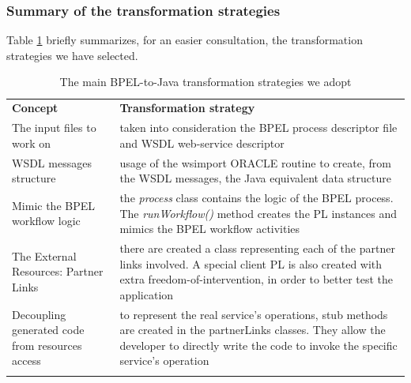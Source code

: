 \subsubsection{Summary of the transformation strategies}
\label{transfStrategySummary}
Table \ref{tab:transStrategies} briefly summarizes, for an easier consultation, the transformation strategies we have selected. 
\begin{table}
\caption{The main BPEL-to-Java transformation strategies we adopt}
\label{tab:transStrategies}
\begin{center}
\begin{tabular}{p{5cm} p{}}
						\toprule
						\addlinespace[0.2cm]
\textbf{Concept} 		& \textbf{Transformation strategy} 	\\ 
						\cmidrule(l){1-2}
The input files to work on 	
				& taken into consideration the BPEL process descriptor file and WSDL web-service descriptor 			 			\\[0,5cm]
WSDL messages structure 	
				&  usage of the wsimport ORACLE routine to create, from the WSDL messages, the Java equivalent data structure  			\\[0,5cm]
Mimic the BPEL workflow logic 	
				& the \textit{process} class contains the logic of the BPEL process. The \textit{runWorkflow()} method creates the PL instances and mimics the BPEL workflow activities  			\\[0,5cm]
The External Resources: Partner Links 		
				&  there are created a class representing each of the partner links involved. A special client PL is also created with extra freedom-of-intervention, in order to better test the application	\\[0,5cm]
Decoupling generated code from resources access 
				& to represent the real service's operations, stub methods are created in the partnerLinks classes. They allow the developer to directly write the code to invoke the specific service's operation
				\\[0,5cm]
\addlinespace[0.2cm]
						\bottomrule
\end{tabular}
\end{center}
\end{table}
